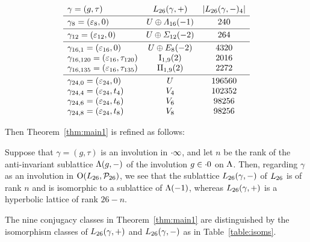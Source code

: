 \documentclass{amsart} %
\begin{document}
%
%
\begin{table}
\[
\begin{array}{lc c }
\gamma=(g, \tau) & \Lts(\gamma, +) & |\Lts(\gamma, -)_4|
\mystrutd{5pt} \\
\hline 
\gamma_{8}=(\vep_8, 0) & U\oplus \Lamsxtn(-1) & 240
\mystruthd{10pt}{5pt} \\
\hline
\gamma_{12}=(\vep_{12}, 0) & U\oplus \Sigmatwlv(-2) & 264
\mystruthd{10pt}{5pt} \\
\hline
\mystruth{10pt}
\gamma_{16, 1}=(\vep_{16}, 0) &U\oplus E_8(-2) &4320\\
\gamma_{16, 120} =(\vep_{16},\tauI) & \typeILat_{1, 9}(2) &2016\\
\gamma_{16, 135} =(\vep_{16},\tauII) & \typeIILat_{1, 9}(2) &2272
\mystrutd{5pt}\\
\hline
\mystruth{10pt}
\gamma_{24, 0}=( \vep_{24}, 0)& U &196560\\
\gamma_{24, 4}=(\vep_{24},t_4)& V_{4} & 102352 \\
\gamma_{24, 6}=( \vep_{24}, t_6) & V_{6} &98256\\
\gamma_{24, 8}=( \vep_{24}, t_8) & V_{8} &98256
\end{array}
\]
\vskip 10pt
\caption{$\Lts(\gamma, +)$ and $\Lts(\gamma,-)$}\label{table:isoms}
%
%
\end{table}
%
Then Theorem~\ref{thm:main1} is refined as follows:
%
\begin{theorem}\label{thm:main2}
Suppose that $\gamma=(g, \tau)$ is an involution
in $\cdot \infty$,
and let $n$ be the rank of 
 the anti-invariant sublattice $\Lambda(g, -)$ of the involution $g\in \cdot 0$ on $\Lambda$.
Then,
regarding $\gamma$ as an involution in $\mathord{\mathrm{O}}(L_{26}, \mathord{\mathcal{P}}_{26})$,
we see that 
the sublattice $\Lts(\gamma, -)$ of $L_{26}$ is of rank $n$ and is isomorphic to a sublattice of $\Lambda (-1)$, 
whereas $\Lts(\gamma, +)$ is a hyperbolic lattice of rank $26-n$.
\par
The nine conjugacy classes in Theorem~\ref{thm:main1} are distinguished by 
the isomorphism classes of $\Lts(\gamma, +)$ and $\Lts(\gamma,-)$ as in Table~\ref{table:isoms}.
\end{theorem}
\end{document}
